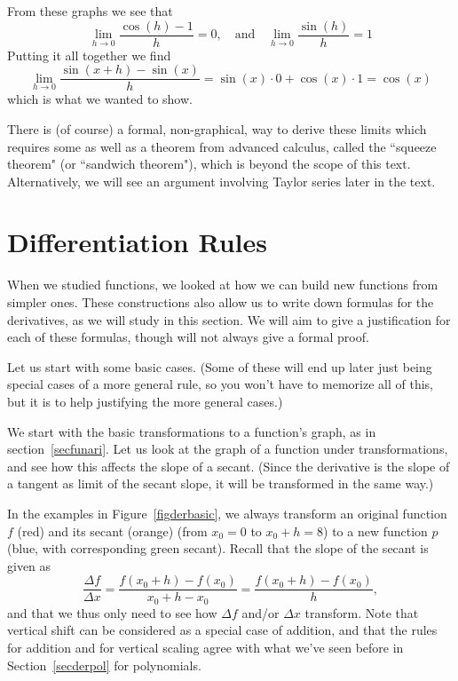 \begin{bsp}
From these graphs we see that 
\[
\lim_{h \to 0}\frac{\cos(h)-1}{h} = 0, \quad\mbox{and}\quad \lim_{h \to 0}\frac{\sin(h)}{h} = 1
\]
Putting it all together we find
\[\lim_{h \to 0}\frac{\sin(x+h)-\sin(x)}{h} = \sin(x) \cdot 0 + \cos(x) \cdot 1 = \cos(x)\]
which is what we wanted to show. 

There is (of course) a formal, non-graphical, way to derive these limits which
requires some as well as a theorem from advanced calculus, called the
``squeeze theorem" (or ``sandwich theorem"), which is beyond the scope of
this text. Alternatively, we will see an argument involving Taylor series
later in the text.
\end{bsp}

\section{Differentiation Rules}

When we studied functions, we looked at how we can build new functions from
simpler ones. These constructions also allow us to write down formulas for the
derivatives, as we will study in this section. We will aim to give a
justification for each of these formulas, though will not always give a
formal proof.

Let us start with some basic cases. (Some of these will end up later just
being special cases of a more general rule, so you won't have to memorize
all of this, but it is to help justifying the more general cases.)

We start with the basic transformations to a function's graph, as in
section~\ref{secfunari}. Let us look at the graph of a function under
transformations, and see how this affects the slope of a secant. (Since the
derivative is the slope of a tangent as limit of the secant slope, it will
be transformed in the same way.)

In the examples in Figure~\ref{figderbasic}, we always transform an original function $f$
(red) and its secant (orange) (from $x_0=0$ to $x_0+h=8$)
to a new function $p$ (blue, with
corresponding green secant). Recall that the slope of the secant is given as
\[
\frac{\Delta f}{\Delta x}=\frac{f(x_0+h)-f(x_0)}{x_0+h-x_0}
=\frac{f(x_0+h)-f(x_0)}{h},
\]
and that we thus only need to see how $\Delta f$ and/or $\Delta x$
transform. Note that vertical shift can be considered as a special case of
addition, and that the rules for addition and for vertical scaling 
agree with what we've seen before in Section~\ref{secderpol} for
polynomials.

